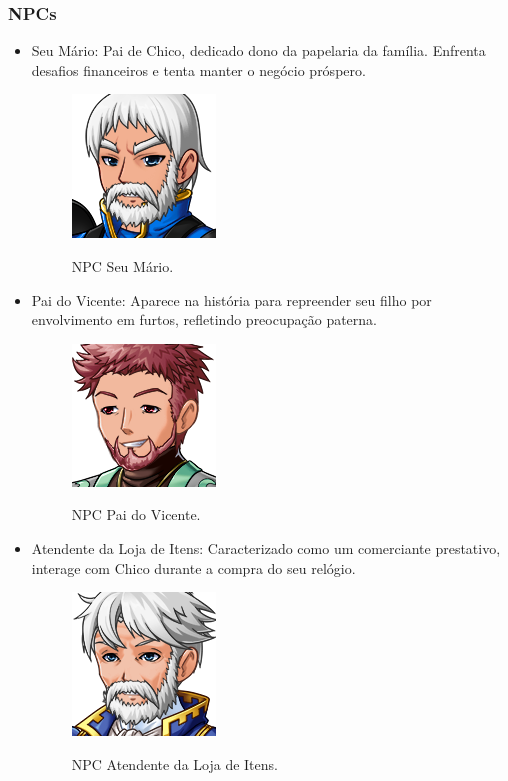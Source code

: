 \subsubsection{NPCs}
\begin{itemize}
	\item Seu Mário: Pai de Chico, dedicado dono da papelaria da família. Enfrenta desafios financeiros e tenta manter o negócio próspero.
	      \begin{figure}[ht]
		      \centering
		      \caption{NPC Seu Mário.}
		      \includegraphics[scale=0.8]{Textuais/Pictures/Seu_Mario.png}
		      \label{fig:npc-seu-mario}
	      \end{figure}
	\item Pai do Vicente: Aparece na história para repreender seu filho por envolvimento em furtos, refletindo preocupação paterna.
	      \begin{figure}[ht]
		      \centering
		      \caption{NPC Pai do Vicente.}
		      \includegraphics[scale=0.8]{Textuais/Pictures/Pai_Vicente.png}
		      \label{fig:npc-pai-vicente}
	      \end{figure}
	\item Atendente da Loja de Itens: Caracterizado como um comerciante prestativo, interage com Chico durante a compra do seu relógio.
	      \begin{figure}[ht]
		      \centering
		      \caption{NPC Atendente da Loja de Itens.}
		      \includegraphics[scale=0.8]{Textuais/Pictures/Atendente_loja_Itens.png}
		      \label{fig:npc-atendente-loja-itens}
	      \end{figure}


\end{itemize}
